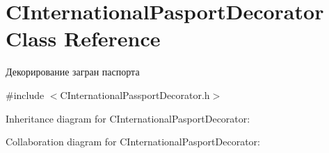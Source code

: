 \hypertarget{classCInternationalPasportDecorator}{}\section{C\+International\+Pasport\+Decorator Class Reference}
\label{classCInternationalPasportDecorator}


Декорирование загран паспорта  




{\ttfamily \#include $<$C\+International\+Passport\+Decorator.\+h$>$}



Inheritance diagram for C\+International\+Pasport\+Decorator\+:


Collaboration diagram for C\+International\+Pasport\+Decorator\+:
